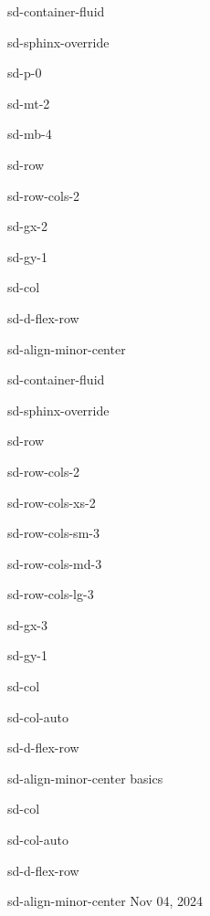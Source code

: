 \documentclass[letterpaper,10pt,english]{jupyterBook}
\begin{document}
\begin{sphinxuseclass}{sd-container-fluid}
\begin{sphinxuseclass}{sd-sphinx-override}
\begin{sphinxuseclass}{sd-p-0}
\begin{sphinxuseclass}{sd-mt-2}
\begin{sphinxuseclass}{sd-mb-4}
\begin{sphinxuseclass}{sd-row}
\begin{sphinxuseclass}{sd-row-cols-2}
\begin{sphinxuseclass}{sd-gx-2}
\begin{sphinxuseclass}{sd-gy-1}
\begin{sphinxuseclass}{sd-col}
\begin{sphinxuseclass}{sd-d-flex-row}
\begin{sphinxuseclass}{sd-align-minor-center}
\begin{sphinxuseclass}{sd-container-fluid}
\begin{sphinxuseclass}{sd-sphinx-override}
\begin{sphinxuseclass}{sd-row}
\begin{sphinxuseclass}{sd-row-cols-2}
\begin{sphinxuseclass}{sd-row-cols-xs-2}
\begin{sphinxuseclass}{sd-row-cols-sm-3}
\begin{sphinxuseclass}{sd-row-cols-md-3}
\begin{sphinxuseclass}{sd-row-cols-lg-3}
\begin{sphinxuseclass}{sd-gx-3}
\begin{sphinxuseclass}{sd-gy-1}
\begin{sphinxuseclass}{sd-col}
\begin{sphinxuseclass}{sd-col-auto}
\begin{sphinxuseclass}{sd-d-flex-row}
\begin{sphinxuseclass}{sd-align-minor-center}
\sphinxAtStartPar
basics

\end{sphinxuseclass}
\end{sphinxuseclass}
\end{sphinxuseclass}
\end{sphinxuseclass}
\begin{sphinxuseclass}{sd-col}
\begin{sphinxuseclass}{sd-col-auto}
\begin{sphinxuseclass}{sd-d-flex-row}
\begin{sphinxuseclass}{sd-align-minor-center}
\sphinxAtStartPar
Nov 04, 2024


\end{sphinxuseclass}
\end{sphinxuseclass}
\end{sphinxuseclass}
\end{sphinxuseclass}
\end{sphinxuseclass}
\end{sphinxuseclass}
\end{sphinxuseclass}
\end{sphinxuseclass}
\end{sphinxuseclass}
\end{sphinxuseclass}
\end{sphinxuseclass}
\end{sphinxuseclass}
\end{sphinxuseclass}
\end{sphinxuseclass}
\end{sphinxuseclass}
\end{sphinxuseclass}
\end{sphinxuseclass}
\end{sphinxuseclass}
\end{sphinxuseclass}
\end{sphinxuseclass}
\end{sphinxuseclass}
\end{sphinxuseclass}
\end{sphinxuseclass}
\end{sphinxuseclass}
\end{sphinxuseclass}
\end{sphinxuseclass}
\end{document}
